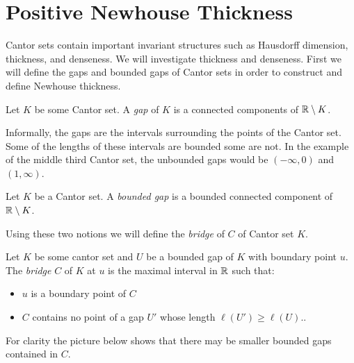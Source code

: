 \section{Positive Newhouse Thickness}
Cantor sets contain important invariant structures such as Hausdorff dimension, thickness, and denseness.  We will investigate thickness and denseness.  First we will define the gaps and bounded gaps of Cantor sets in order to construct and define Newhouse thickness. 
\begin{definition}[Gap]
    Let $K$ be some Cantor set.  A \textit{gap} of $K$ is a connected components of $\mathbb{R} \setminus K$.      
\end{definition}  Informally, the gaps are the intervals surrounding the points of the Cantor set.  Some of the lengths of these intervals are bounded some are not.  In the example of the middle third Cantor set, the unbounded gaps would be $(-\infty, 0)$ and $(1, \infty)$.  

\begin{definition}
    Let $K$ be a Cantor set.  A \textit{bounded gap} is a bounded connected component of $\mathbb{R} \setminus K$.      
\end{definition}

Using these two notions we will define the \textit{bridge} of $C$ of Cantor set $K$.  
\begin{definition}[Bridge]\cite{palis&takens}
    Let $K$ be some cantor set and $U$ be a bounded gap of $K$ with boundary point $u$.  The \textit{bridge} $C$ of $K$ at $u$ is the maximal interval in $\mathbb{R}$ such that:
    \begin{itemize}
        \item $u$ is a boundary point of $C$
        \item $C$ contains no point of a gap $U'$ whose length $\ell(U') \geq \ell(U)$..
    \end{itemize}
\end{definition}

For clarity the picture below shows that there may be smaller bounded gaps contained in $C$.  

\vspace*{0.25cm}
{}

